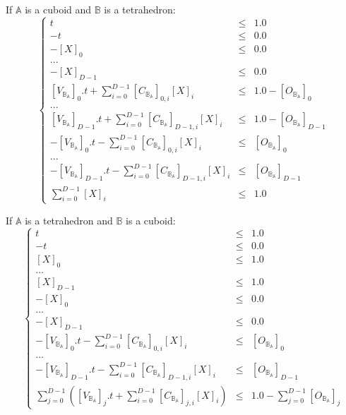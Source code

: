 \documentclass[12pt, a4paper]{article}
\begin{document}
If $\mathbb{A}$ is a cuboid and $\mathbb{B}$ is a tetrahedron:
\begin{equation}
\left\lbrace
\begin{array}{rcl}
t&\le&1.0\\
-t&\le&0.0\\
-\left[X\right]_0&\le&0.0\\
...\\
-\left[X\right]_{D-1}&\le&0.0\\
\left[V_{\mathbb{B}_\mathbb{A}}\right]_0.t+\sum_{i=0}^{D-1}\left[C_{\mathbb{B}_\mathbb{A}}\right]_{0,i}\left[X\right]_i&\le&1.0-\left[O_{\mathbb{B}_\mathbb{A}}\right]_0\\
...\\
\left[V_{\mathbb{B}_\mathbb{A}}\right]_{D-1}.t+\sum_{i=0}^{D-1}\left[C_{\mathbb{B}_\mathbb{A}}\right]_{D-1,i}\left[X\right]_i&\le&1.0-\left[O_{\mathbb{B}_\mathbb{A}}\right]_{D-1}\\
-\left[V_{\mathbb{B}_\mathbb{A}}\right]_0.t-\sum_{i=0}^{D-1}\left[C_{\mathbb{B}_\mathbb{A}}\right]_{0,i}\left[X\right]_i&\le&\left[O_{\mathbb{B}_\mathbb{A}}\right]_0\\
...\\
-\left[V_{\mathbb{B}_\mathbb{A}}\right]_{D-1}.t-\sum_{i=0}^{D-1}\left[C_{\mathbb{B}_\mathbb{A}}\right]_{D-1,i}\left[X\right]_i&\le&\left[O_{\mathbb{B}_\mathbb{A}}\right]_{D-1}\\
\sum_{i=0}^{D-1}\left[X\right]_i&\le&1.0
\end{array}
\right.
\end{equation}

If $\mathbb{A}$ is a tetrahedron and $\mathbb{B}$ is a cuboid:
\begin{equation}
\left\lbrace
\begin{array}{rcl}
t&\le&1.0\\
-t&\le&0.0\\
\left[X\right]_0&\le&1.0\\
...\\
\left[X\right]_{D-1}&\le&1.0\\
-\left[X\right]_0&\le&0.0\\
...\\
-\left[X\right]_{D-1}&\le&0.0\\
-\left[V_{\mathbb{B}_\mathbb{A}}\right]_0.t-\sum_{i=0}^{D-1}\left[C_{\mathbb{B}_\mathbb{A}}\right]_{0,i}\left[X\right]_i&\le&\left[O_{\mathbb{B}_\mathbb{A}}\right]_0\\
...\\
-\left[V_{\mathbb{B}_\mathbb{A}}\right]_{D-1}.t-\sum_{i=0}^{D-1}\left[C_{\mathbb{B}_\mathbb{A}}\right]_{D-1,i}\left[X\right]_i&\le&\left[O_{\mathbb{B}_\mathbb{A}}\right]_{D-1}\\
\sum_{j=0}^{D-1}\left(\left[V_{\mathbb{B}_\mathbb{A}}\right]_j.t+\sum_{i=0}^{D-1}\left[C_{\mathbb{B}_\mathbb{A}}\right]_{j,i}\left[X\right]_i\right)&\le&1.0-\sum_{j=0}^{D-1}\left[O_{\mathbb{B}_\mathbb{A}}\right]_{j}
\end{array}
\right.
\end{equation}
\end{document}
